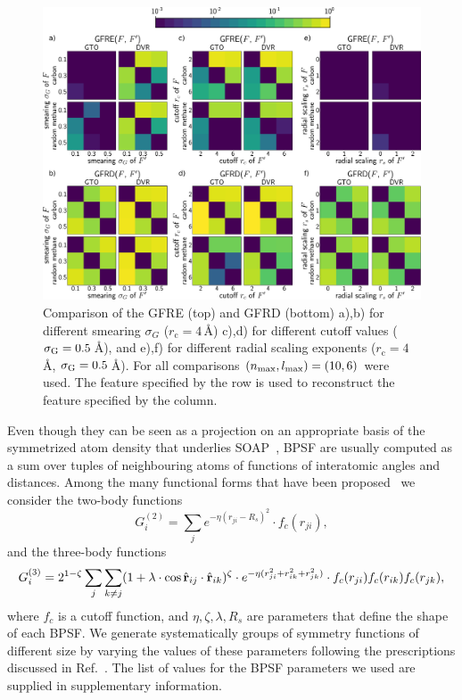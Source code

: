 \begin{figure}
    \includegraphics[width=0.9\linewidth]{fig/rof/sigma_radial_scaling_cutoff_comparison-gfrd-gto_dvr-methane_carbon-inkscaped-v2.pdf}
    \caption{Comparison of the GFRE (top) and GFRD (bottom) a),b) for different smearing  $\sigma_G$ ($r_\text{c}=4\,$\AA{}) c),d) for different cutoff values ($\sigma_\text{G}=0.5\,$\AA), and e),f) for different radial scaling exponents ($r_\text{c}=4\,$\AA{}, $\sigma_\text{G}=0.5\,$\AA). For all comparisons $(n_\mathrm{max},l_\mathrm{max}) = (10,6)$ were used. The feature specified by the row is used to reconstruct the feature specified by the column.}
    \label{fig:soap-sigma-radial-body}
\end{figure}

Even though they can be seen as a projection on an appropriate basis of the symmetrized atom density that underlies SOAP~\cite{will+19jcp}, BPSF are usually computed as a sum over tuples of neighbouring atoms of functions of interatomic angles and distances. Among the many functional forms that have been proposed~\cite{behl11pccp} we consider the two-body functions
%
\begin{equation}
    G^{(2)}_i = \sum_j e^{-\eta (r_{ji} - R_s)^2} \cdot f_c (r_{ji}), \label{eq:g2}
\end{equation}
and the three-body functions
\begin{equation}
    G^{(3)}_i = 2^{1-\zeta} \sum_j \sum_{k \neq j } (1 + \lambda \cdot \cos \hat{\mathbf{r}}_{ij}\cdot\hat{\mathbf{r}}_{ik})^{\zeta} \cdot
    e^{-\eta (r_{ji}^2 + r_{ik}^2 + r_{jk}^2)} \cdot f_c(r_{ji}) f_c(r_{ik}) f_c(r_{jk}), \label{eq:g3}
\end{equation}
where $f_c$ is a cutoff function, and $\eta,\zeta,\lambda,R_s$ are parameters that define the shape of each BPSF. We generate systematically groups of symmetry functions of different size by varying the values of these parameters following the prescriptions discussed in Ref.~. The list of values for the BPSF parameters we used are supplied in supplementary information.

